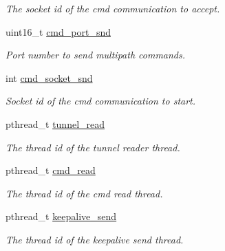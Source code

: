 \begin{DoxyCompactItemize}
\begin{DoxyCompactList}\small\item\em The socket id of the cmd communication to accept. \end{DoxyCompactList}\item 
\hypertarget{structtunnel__struct_aa9395a07a496692059827f0e53240d0a}{uint16\-\_\-t \hyperlink{structtunnel__struct_aa9395a07a496692059827f0e53240d0a}{cmd\-\_\-port\-\_\-snd}}\label{structtunnel__struct_aa9395a07a496692059827f0e53240d0a}

\begin{DoxyCompactList}\small\item\em Port number to send multipath commands. \end{DoxyCompactList}\item 
\hypertarget{structtunnel__struct_a3fdbecf954c0ec40d5d647f10c94246e}{int \hyperlink{structtunnel__struct_a3fdbecf954c0ec40d5d647f10c94246e}{cmd\-\_\-socket\-\_\-snd}}\label{structtunnel__struct_a3fdbecf954c0ec40d5d647f10c94246e}

\begin{DoxyCompactList}\small\item\em Socket id of the cmd communication to start. \end{DoxyCompactList}\item 
\hypertarget{structtunnel__struct_a298d9f0487596ab7a150ec84ee27d4b9}{pthread\-\_\-t \hyperlink{structtunnel__struct_a298d9f0487596ab7a150ec84ee27d4b9}{tunnel\-\_\-read}}\label{structtunnel__struct_a298d9f0487596ab7a150ec84ee27d4b9}

\begin{DoxyCompactList}\small\item\em The thread id of the tunnel reader thread. \end{DoxyCompactList}\item 
\hypertarget{structtunnel__struct_a0e1ea5eeab80b46a2305f95fbe9fe68d}{pthread\-\_\-t \hyperlink{structtunnel__struct_a0e1ea5eeab80b46a2305f95fbe9fe68d}{cmd\-\_\-read}}\label{structtunnel__struct_a0e1ea5eeab80b46a2305f95fbe9fe68d}

\begin{DoxyCompactList}\small\item\em The thread id of the cmd read thread. \end{DoxyCompactList}\item 
\hypertarget{structtunnel__struct_aeefaa0227a16950d4e31d54612f63984}{pthread\-\_\-t \hyperlink{structtunnel__struct_aeefaa0227a16950d4e31d54612f63984}{keepalive\-\_\-send}}\label{structtunnel__struct_aeefaa0227a16950d4e31d54612f63984}

\begin{DoxyCompactList}\small\item\em The thread id of the keepalive send thread. \end{DoxyCompactList}\end{DoxyCompactItemize}



